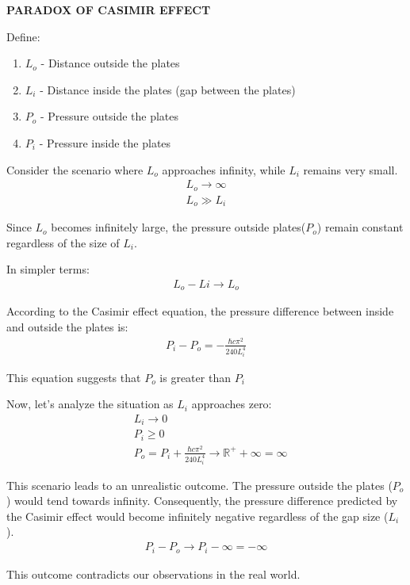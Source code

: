 \noindent\textbf{PARADOX OF CASIMIR EFFECT}


Define:
\begin{enumerate}
    \item \(L_o\) - Distance outside the plates
    \item \(L_i\) - Distance inside the plates (gap between the plates)
    \item \(P_o\) - Pressure outside the plates
    \item \(P_i\) - Pressure inside the plates
\end{enumerate}

Consider the scenario where  $L_o$ approaches infinity, while $L_i$ remains very small.
\begin{align}
    L_o \rightarrow \infty \\
    L_o \gg L_i
\end{align}

Since $L_o$ becomes infinitely large, the pressure outside plates($P_o$) remain constant regardless of the size of $L_i$.

\noindent In simpler terms:
\begin{align}L_o - Li \rightarrow L_o\end{align}

According to the Casimir effect equation\citep*{enwiki:1212199656}, the pressure difference between inside and outside the plates is:
\begin{align}P_i - P_o = -\frac{\hbar c \pi^2}{240 L_i^4}\end{align}

This equation suggests that $P_o$ is greater than $P_i$

Now, let's analyze the situation as $L_i$ approaches zero:
\begin{align}
    &L_i \rightarrow 0 \\
    &P_i \ge 0 \\
    &P_o = P_i + \frac{\hbar c \pi^2}{240 L_i^4} \rightarrow {\mathbb{R}}^+ + \infty = \infty
\end{align}

This scenario leads to an unrealistic outcome. The pressure outside the plates ($P_o$) would tend towards infinity.
Consequently, the pressure difference predicted by the Casimir effect would become infinitely negative regardless of the gap size ($L_i$).
\begin{align}P_i - P_o \rightarrow P_i - \infty = - \infty\end{align}

This outcome contradicts our observations in the real world.

